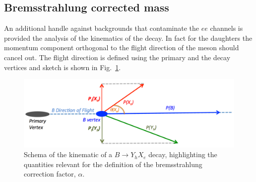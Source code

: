 %


\subsection{Bremsstrahlung corrected mass}
\label{sec:BCM}

An additional handle against backgrounds that contaminate the $ee$ channels is provided the analysis of the kinematics of the decay.
In fact for the \Bz daughters the momentum component orthogonal to the flight direction of the \Bz meson should cancel out.
The flight direction is defined using the primary and the decay vertices and sketch is shown in Fig.~\ref{fig:schemaHOP}. 
\begin{figure}[tb]
  \begin{center}
    \includegraphics[width=1.0\linewidth]{RKst/figs/HOP/schemaHOP.pdf}
    \vspace*{-1.0cm}
  \end{center}
  \caption{ Schema of the kinematic of a $B \to Y_h X_e$ decay, highlighting the quantities relevant for the 
  definition of the bremsstrahlung correction factor, $\alpha$.}
  \label{fig:schemaHOP}
\end{figure}

